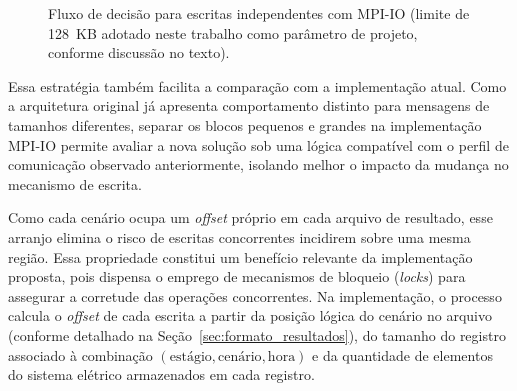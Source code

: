 \begin{figure}[H]
  \centering
  \caption{Fluxo de decisão para escritas independentes com MPI-IO
  (limite de 128~KB adotado neste trabalho como parâmetro de projeto,
  conforme discussão no texto).}
  \label{fig:fluxo_escrita_independente}
\end{figure}

Essa estratégia também facilita a comparação com a implementação atual. Como a
arquitetura original já apresenta comportamento distinto para mensagens de
tamanhos diferentes, separar os blocos pequenos e grandes na implementação
MPI-IO permite avaliar a nova solução sob uma lógica compatível com o perfil
de comunicação observado anteriormente, isolando melhor o impacto da mudança
no mecanismo de escrita.

Como cada cenário ocupa um \textit{offset} próprio em cada arquivo
de resultado, esse arranjo elimina o risco de escritas concorrentes
incidirem sobre uma mesma região. Essa propriedade constitui um benefício
relevante da implementação proposta, pois dispensa o emprego de
mecanismos de bloqueio (\textit{locks}) para assegurar a corretude
das operações concorrentes. Na implementação, o processo calcula o \textit{offset} de cada
escrita a partir da posição lógica do cenário no arquivo
(conforme detalhado na Seção~\ref{sec:formato_resultados}),
do tamanho do registro associado à combinação
$(\text{estágio}, \text{cenário}, \text{hora})$ e da quantidade de
elementos do sistema elétrico armazenados em cada registro.

